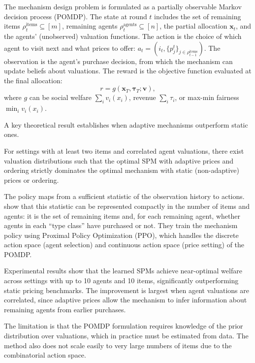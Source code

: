 The mechanism design problem is formulated as a partially observable Markov decision process (POMDP). The state at round $t$ includes the set of remaining items $\rho_t^{\text{items}} \subseteq [m]$, remaining agents $\rho_t^{\text{agents}} \subseteq [n]$, the partial allocation $\mathbf{x}_t$, and the agents' (unobserved) valuation functions. The action is the choice of which agent to visit next and what prices to offer: $a_t = (i_t, \{p_j^t\}_{j \in \rho_{t-1}^{\text{items}}})$. The observation is the agent's purchase decision, from which the mechanism can update beliefs about valuations. The reward is the objective function evaluated at the final allocation:
\begin{equation}
r = g(\mathbf{x}_T, \boldsymbol{\tau}_T; \mathbf{v}), \label{eq:brero_reward}
\end{equation}
where $g$ can be social welfare $\sum_{i} v_i(x_i)$, revenue $\sum_i \tau_i$, or max-min fairness $\min_i v_i(x_i)$.

A key theoretical result establishes when adaptive mechanisms outperform static ones.

\begin{theorem}
For settings with at least two items and correlated agent valuations, there exist valuation distributions such that the optimal SPM with adaptive prices and ordering strictly dominates the optimal mechanism with static (non-adaptive) prices or ordering.
\end{theorem}

The policy maps from a sufficient statistic of the observation history to actions. \citet{BreroEtAl2021} show that this statistic can be represented compactly in the number of items and agents: it is the set of remaining items and, for each remaining agent, whether agents in each ``type class'' have purchased or not. They train the mechanism policy using Proximal Policy Optimization (PPO), which handles the discrete action space (agent selection) and continuous action space (price setting) of the POMDP.

Experimental results show that the learned SPMs achieve near-optimal welfare across settings with up to 10 agents and 10 items, significantly outperforming static pricing benchmarks. The improvement is largest when agent valuations are correlated, since adaptive prices allow the mechanism to infer information about remaining agents from earlier purchases.

The limitation is that the POMDP formulation requires knowledge of the prior distribution over valuations, which in practice must be estimated from data. The method also does not scale easily to very large numbers of items due to the combinatorial action space.


